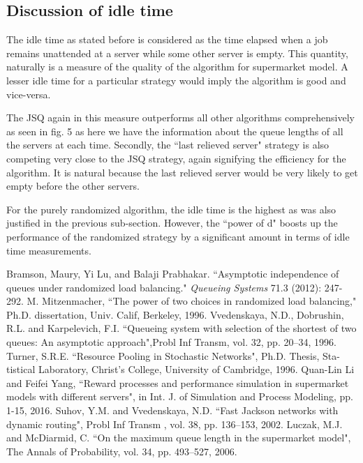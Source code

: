 \documentclass[a4paper,english,12pt]{article}
\begin{document}
\subsection{Discussion of idle time}
The idle time as stated before is considered as the time elapsed when a job remains unattended at a server while some other server is empty. This quantity, naturally is a measure of the quality of the algorithm for supermarket model. A lesser idle time for a particular strategy would imply the algorithm is good and vice-versa.
\par The JSQ again in this measure outperforms all other algorithms comprehensively as seen in fig. 5 as here we have the information about the queue lengths of all the servers at each time. Secondly, the ``last relieved server" strategy is also competing very close to the JSQ strategy, again signifying the efficiency for the algorithm. It is natural because the last relieved server would be very likely to get empty before the other servers.
\par For the purely randomized algorithm, the idle time is the highest as was also justified in the previous sub-section. However, the ``power of d" boosts up the performance of the randomized strategy by a significant amount in terms of idle time measurements.

\begin{thebibliography}{11}
Bramson, Maury, Yi Lu, and Balaji Prabhakar. ``Asymptotic independence of queues under randomized load balancing." \textit{Queueing Systems} 71.3 (2012): 247-292.
M. Mitzenmacher, ``The power of two choices in randomized load balancing," Ph.D. dissertation, Univ. Calif, Berkeley, 1996.
Vvedenskaya, N.D., Dobrushin, R.L. and Karpelevich, F.I. ``Queueing system
with selection of the shortest of two queues:  An asymptotic approach",Probl  Inf Transm, vol. 32, pp. 20–34, 1996.
Turner, S.R.E. ``Resource Pooling in Stochastic Networks", Ph.D. Thesis, Sta-
tistical Laboratory, Christ’s College, University of Cambridge, 1996.
Quan-Lin Li and Feifei Yang, ``Reward processes and performance simulation in
supermarket models with different servers", in Int. J. of Simulation and Process Modeling, pp. 1-15, 2016.
 Suhov, Y.M. and Vvedenskaya, N.D. ``Fast Jackson
networks with dynamic routing",
Probl Inf Transm , vol. 38, pp. 136–153, 2002.
 Luczak, M.J. and McDiarmid, C. ``On the maximum queue length in the
supermarket model", The Annals of Probability, vol. 34, pp. 493–527, 2006.
\end{thebibliography}
\end{document}
